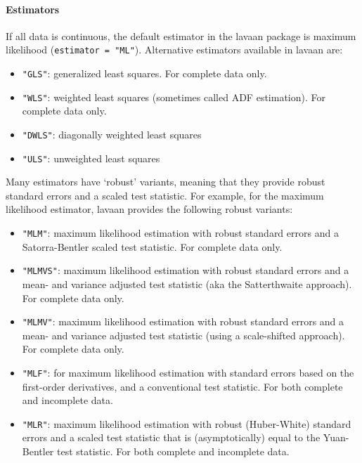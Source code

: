 \paragraph{Estimators}

If all data is continuous, the default estimator in the lavaan package
is maximum likelihood (\texttt{estimator = "ML"}). Alternative
estimators available in lavaan are:

\begin{itemize}
\itemsep1pt\parskip0pt
\item
  \texttt{"GLS"}: generalized least squares. For complete data only.
\item
  \texttt{"WLS"}: weighted least squares (sometimes called ADF
  estimation). For complete data only.
\item
  \texttt{"DWLS"}: diagonally weighted least squares
\item
  \texttt{"ULS"}: unweighted least squares
\end{itemize}

Many estimators have `robust' variants, meaning that they provide robust
standard errors and a scaled test statistic. For example, for the
maximum likelihood estimator, lavaan provides the following robust
variants:

\begin{itemize}
\itemsep1pt\parskip0pt
\item
  \texttt{"MLM"}: maximum likelihood estimation with robust standard
  errors and a Satorra-Bentler scaled test statistic. For complete data
  only.
\item
  \texttt{"MLMVS"}: maximum likelihood estimation with robust standard
  errors and a mean- and variance adjusted test statistic (aka the
  Satterthwaite approach). For complete data only.
\item
  \texttt{"MLMV"}: maximum likelihood estimation with robust standard
  errors and a mean- and variance adjusted test statistic (using a
  scale-shifted approach). For complete data only.
\item
  \texttt{"MLF"}: for maximum likelihood estimation with standard errors
  based on the first-order derivatives, and a conventional test
  statistic. For both complete and incomplete data.
\item
  \texttt{"MLR"}: maximum likelihood estimation with robust
  (Huber-White) standard errors and a scaled test statistic that is
  (asymptotically) equal to the Yuan-Bentler test statistic. For both
  complete and incomplete data.
\end{itemize}

